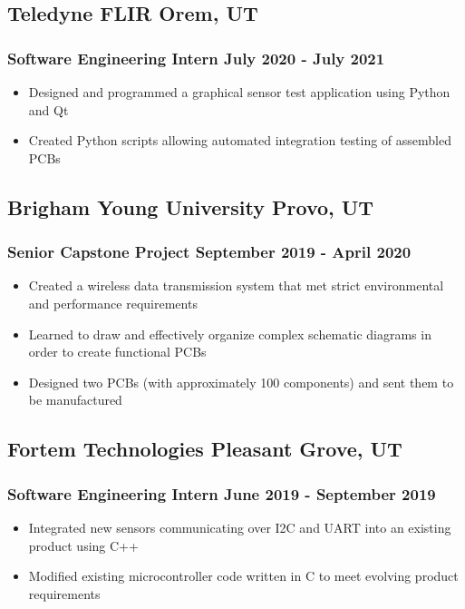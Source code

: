 \documentclass[11pt]{article} %
\begin{document}
\subsection{Teledyne FLIR \hfill Orem, UT}
\subsubsection{Software Engineering Intern \hfill July 2020 - July 2021}
\begin{itemize}
	\item Designed and programmed a graphical sensor test application using Python and Qt
	\item Created Python scripts allowing automated integration testing of assembled PCBs
\end{itemize}

\subsection{Brigham Young University \hfill Provo, UT}
\subsubsection{Senior Capstone Project \hfill September 2019 - April 2020}
\begin{itemize}
	\item Created a wireless data transmission system that met strict environmental and performance requirements
	\item Learned to draw and effectively organize complex schematic diagrams in order to create functional PCBs
	\item Designed two PCBs (with approximately 100 components) and sent them to be manufactured
\end{itemize}

\subsection{Fortem Technologies \hfill Pleasant Grove, UT}
\subsubsection{Software Engineering Intern \hfill June 2019 - September 2019}
\begin{itemize}
	\item Integrated new sensors communicating over I2C and UART into an existing product using C++
	\item Modified existing microcontroller code written in C to meet evolving product requirements
\end{itemize}
\end{document}
